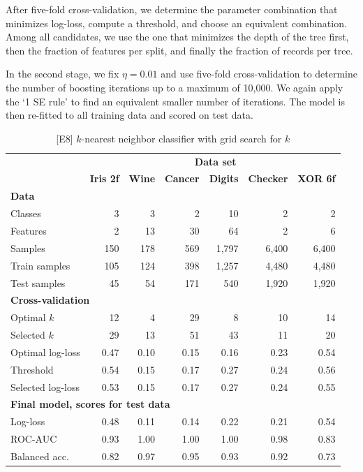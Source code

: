 %
After five-fold cross-validation, we determine the parameter combination that minimizes log-loss, compute a threshold, and choose an equivalent combination.
Among all candidates, we use the one that minimizes the depth of the tree first, then the fraction of features per split, and finally the fraction of records per tree.\par
%
In the second stage, we fix $\eta=0.01$ and use five-fold cross-validation to determine the number of boosting iterations up to a maximum of 10,000.
We again apply the `1 SE rule' to find an equivalent smaller number of iterations.
The model is then re-fitted to all training data and scored on test data.\par
%
\begin{table}
\caption{[E8] $k$-nearest neighbor classifier with grid search for $k$}
\label{tab_e8}
%
\begin{center}
\small
\begin{tabular}{|lrrrrrr|}
\hline
&\multicolumn{6}{c|}{\textbf{\hrulefill\ Data set \hrulefill}}\\
&\textbf{Iris 2f}&\textbf{Wine}&\textbf{Cancer}&\textbf{Digits}&\textbf{Checker}&\textbf{XOR 6f}\\
\multicolumn{7}{|l|}{\textbf{Data}}\\
Classes&3&3&2&10&2&2\\
Features&2&13&30&64&2&6\\
Samples&150&178&569&1,797&6,400&6,400\\
Train samples&105&124&398&1,257&4,480&4,480\\
Test samples&45&54&171&540&1,920&1,920\\
\multicolumn{7}{|l|}{\textbf{Cross-validation}}\\
Optimal $k$&12&4&29&8&10&14\\
Selected $k$&29&13&51&43&11&20\\
Optimal log-loss&0.47&0.10&0.15&0.16&0.23&0.54\\
Threshold&0.54&0.15&0.17&0.27&0.24&0.56\\
Selected log-loss&0.53&0.15&0.17&0.27&0.24&0.55\\
\multicolumn{7}{|l|}{\textbf{Final model, scores for test data}}\\
Log-loss&0.48&0.11&0.14&0.22&0.21&0.54\\
ROC-AUC&0.93&1.00&1.00&1.00&0.98&0.83\\
Balanced acc.&0.82&0.97&0.95&0.93&0.92&0.73\\
\hline
\end{tabular}
\end{center}
\end{table}
